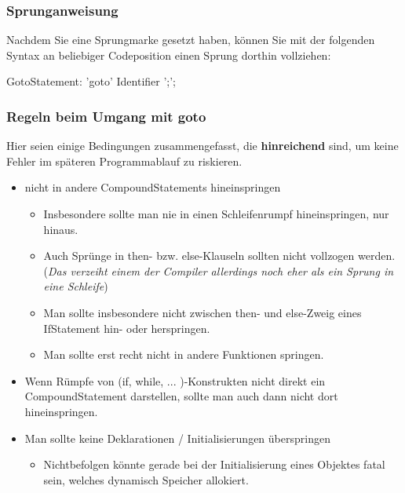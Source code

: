 \documentclass[a4paper]{report}
\begin{document}
\subsubsection{Sprunganweisung}
Nachdem Sie eine Sprungmarke gesetzt haben, können Sie mit der folgenden Syntax an beliebiger Codeposition einen Sprung dorthin vollziehen:
\begin{rail}
	GotoStatement: 'goto' Identifier ';';
\end{rail}

\subsubsection{Regeln beim Umgang mit goto}
Hier seien einige Bedingungen zusammengefasst, die \textbf{hinreichend} sind, um keine Fehler im späteren Programmablauf zu riskieren.
\begin{itemize}
	\item nicht in andere CompoundStatements hineinspringen
	\begin{itemize}
		\item  Insbesondere sollte man nie in einen Schleifenrumpf hineinspringen, nur hinaus.
		\item  Auch Sprünge in then- bzw. else-Klauseln sollten nicht vollzogen werden. (\textit{Das verzeiht einem der Compiler allerdings noch eher als ein Sprung in eine Schleife})
		\item  Man sollte insbesondere nicht zwischen then- und else-Zweig eines IfStatement hin- oder herspringen.
		\item  Man sollte erst recht nicht in andere Funktionen springen.
	\end{itemize}
	\item Wenn Rümpfe von (if, while, ... )-Konstrukten nicht direkt ein CompoundStatement darstellen, sollte man auch dann nicht dort hineinspringen.
	\item Man sollte keine Deklarationen / Initialisierungen überspringen
	\begin{itemize}
		\item Nichtbefolgen könnte gerade bei der Initialisierung eines Objektes fatal sein, welches dynamisch Speicher allokiert.
	\end{itemize}
\end{itemize}
\end{document}
